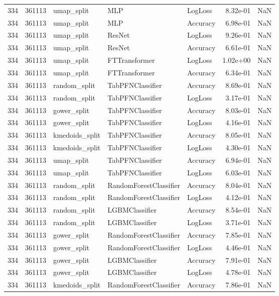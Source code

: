 \begin{tabular}{rrlllrr}
334 & 361113 & umap\_split & MLP & LogLoss & 8.32e-01 & NaN \\
334 & 361113 & umap\_split & MLP & Accuracy & 6.98e-01 & NaN \\
334 & 361113 & umap\_split & ResNet & LogLoss & 9.26e-01 & NaN \\
334 & 361113 & umap\_split & ResNet & Accuracy & 6.61e-01 & NaN \\
334 & 361113 & umap\_split & FTTransformer & LogLoss & 1.02e+00 & NaN \\
334 & 361113 & umap\_split & FTTransformer & Accuracy & 6.34e-01 & NaN \\
334 & 361113 & random\_split & TabPFNClassifier & Accuracy & 8.69e-01 & NaN \\
334 & 361113 & random\_split & TabPFNClassifier & LogLoss & 3.17e-01 & NaN \\
334 & 361113 & gower\_split & TabPFNClassifier & Accuracy & 8.03e-01 & NaN \\
334 & 361113 & gower\_split & TabPFNClassifier & LogLoss & 4.16e-01 & NaN \\
334 & 361113 & kmedoids\_split & TabPFNClassifier & Accuracy & 8.05e-01 & NaN \\
334 & 361113 & kmedoids\_split & TabPFNClassifier & LogLoss & 4.30e-01 & NaN \\
334 & 361113 & umap\_split & TabPFNClassifier & Accuracy & 6.94e-01 & NaN \\
334 & 361113 & umap\_split & TabPFNClassifier & LogLoss & 6.03e-01 & NaN \\
334 & 361113 & random\_split & RandomForestClassifier & Accuracy & 8.04e-01 & NaN \\
334 & 361113 & random\_split & RandomForestClassifier & LogLoss & 4.12e-01 & NaN \\
334 & 361113 & random\_split & LGBMClassifier & Accuracy & 8.54e-01 & NaN \\
334 & 361113 & random\_split & LGBMClassifier & LogLoss & 3.71e-01 & NaN \\
334 & 361113 & gower\_split & RandomForestClassifier & Accuracy & 7.85e-01 & NaN \\
334 & 361113 & gower\_split & RandomForestClassifier & LogLoss & 4.46e-01 & NaN \\
334 & 361113 & gower\_split & LGBMClassifier & Accuracy & 7.91e-01 & NaN \\
334 & 361113 & gower\_split & LGBMClassifier & LogLoss & 4.78e-01 & NaN \\
334 & 361113 & kmedoids\_split & RandomForestClassifier & Accuracy & 7.86e-01 & NaN \\

\end{tabular}
